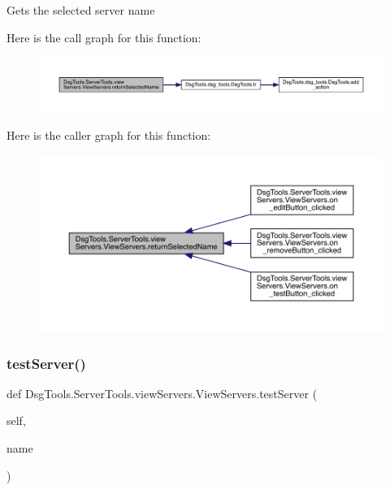 \begin{DoxyVerb}Gets the selected server name 
\end{DoxyVerb}
 Here is the call graph for this function\+:
\nopagebreak
\begin{figure}[H]
\begin{center}
\leavevmode
\includegraphics[width=350pt]{class_dsg_tools_1_1_server_tools_1_1view_servers_1_1_view_servers_a0be08903e376224c84b40183e1cfd327_cgraph}
\end{center}
\end{figure}
Here is the caller graph for this function\+:
\nopagebreak
\begin{figure}[H]
\begin{center}
\leavevmode
\includegraphics[width=350pt]{class_dsg_tools_1_1_server_tools_1_1view_servers_1_1_view_servers_a0be08903e376224c84b40183e1cfd327_icgraph}
\end{center}
\end{figure}
\mbox{\label{class_dsg_tools_1_1_server_tools_1_1view_servers_1_1_view_servers_a89e079ce02772a75b08d6ffb77e0b516}} 
\subsubsection{\texorpdfstring{test\+Server()}{testServer()}}
{\footnotesize\ttfamily def Dsg\+Tools.\+Server\+Tools.\+view\+Servers.\+View\+Servers.\+test\+Server (\begin{DoxyParamCaption}\item[{}]{self,  }\item[{}]{name }\end{DoxyParamCaption})}

